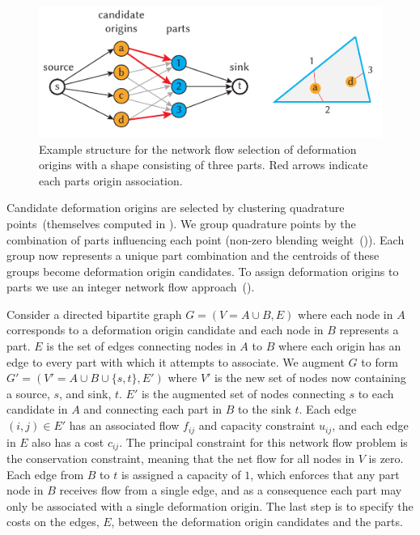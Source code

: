 
\begin{figure}[h]
    \includegraphics[width=\columnwidth]{figures/origin_network}
    \caption{Example structure for the network flow selection of deformation origins with a shape consisting of three parts. Red arrows indicate each parts origin association. }
    \label{fig:network_flow} 
\end{figure}

Candidate deformation origins are selected by clustering quadrature points~(themselves computed in ).
We group quadrature points by the combination of parts influencing each point (non-zero blending weight~()).
Each group now represents a unique part combination and the centroids of these groups become deformation origin candidates.
To assign deformation origins to parts we use an integer network flow approach~(). 

Consider a directed bipartite graph $G=(V = A \cup B,E)$ where each node in $A$ corresponds to a deformation origin candidate and each node in $B$ represents a part. 
$E$ is the set of edges connecting nodes in $A$ to $B$ where each origin has an edge to every part with which it attempts to associate. 
We augment $G$ to form $G'=(V' = A \cup B \cup \{s,t\}, E')$ where $V'$  is the new set of nodes now containing a source, $s$, and sink, $t$. 
$E'$ is the augmented set of nodes connecting $s$ to each candidate in $A$ and connecting each part in $B$ to the sink $t$. 
Each edge $(i,j) \in E'$ has an associated flow $f_{ij}$ and capacity constraint $u_{ij}$, and each edge in $E$ also has a cost $c_{ij}$. 
The principal constraint for this network flow problem is the conservation constraint, meaning that the net flow for all nodes in $V$ is zero.
Each edge from $B$ to $t$ is assigned a capacity of $1$, which enforces that any part node in $B$ receives flow from a single edge, 
and as a consequence each part may only be associated with a single deformation origin. 
The last step is to specify the costs on the edges, $E$, between the deformation origin candidates and the parts. 

